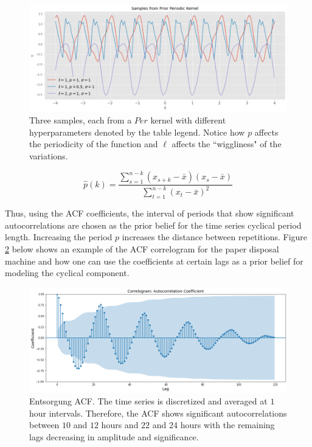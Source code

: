 \begin{figure}[htp]
\centering
\graphicspath{ {./images/} }
\includegraphics[scale=0.49]{images/samples_periodic_prior.png}
\caption{Three samples, each from a $Per$ kernel with different hyperparameters denoted by the table legend. Notice how $p$ affects the periodicity of the function and $\ell$ affects the ``wiggliness" of the variations.}
\label{fig:fig2}
\end{figure}

\begin{equation}
    \hat{p}(k) = \frac{\sum_{s=1}^{n-k}(x_{s+k} - \bar{x})(x_s - \bar{x})}{\sum_{t=1}^{n-k}(x_t - \bar{x})^2} 
\end{equation}

Thus, using the ACF coefficients, the interval of periods that show significant autocorrelations are chosen as the prior belief for the time series cyclical period length. Increasing the period $p$ increases the distance between repetitions. Figure \ref{fig:fig3} below shows an example of the ACF correlogram for the paper disposal machine and how one can use the coefficients at certain lags as a prior belief for modeling the cyclical component. 

\begin{figure}[htp]
\centering
\graphicspath{ {./images/} }
\includegraphics[scale=0.48]{images/entsorgung_acf.png}
\caption{Entsorgung ACF. The time series is discretized and averaged at $1$ hour intervals. Therefore, the ACF shows significant autocorrelations between $10$ and $12$ hours and $22$ and $24$ hours with the remaining lags decreasing in amplitude and significance.}
\label{fig:fig3}
\end{figure}

